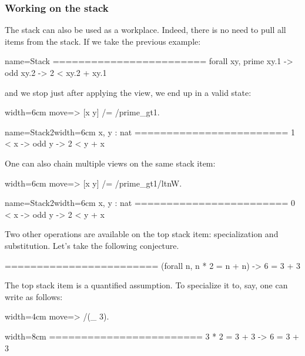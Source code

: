 \subsubsection{Working on the stack}

The stack can also be used as a workplace.  Indeed, there is no need
to pull all items from the stack.  If we take the previous example:

\begin{coqout}{name=Stack}{}
========================
forall xy, prime xy.1 -> odd xy.2 -> 2 < xy.2 + xy.1
\end{coqout}
and we stop just after applying the view, we end up in a valid state:

\begin{coq-left}{}{width=6cm}
move=> [x y] /= /prime_gt1.
$~$
$~$
\end{coq-left}
\begin{coqout-right}{name=Stack2}{width=6cm}
 x, y : nat
 ========================
 1 < x -> odd y -> 2 < y + x
\end{coqout-right}

One can also chain multiple views on the same stack item:

\begin{coq-left}{}{width=6cm}
move=> [x y] /= /prime_gt1/ltnW.
$~$
$~$
\end{coq-left}
\begin{coqout-right}{name=Stack2}{width=6cm}
 x, y : nat
 ========================
 0 < x -> odd y -> 2 < y + x
\end{coqout-right}

Two other operations are available on the top stack item: specialization
and substitution.  Let's take the following conjecture.

\begin{coqout}{}{}
========================
(forall n, n * 2 = n + n) -> 6 = 3 + 3
\end{coqout}

The top stack item is a quantified assumption.  To specialize it to, say,
 one can write as follows:

\begin{coq-left}{}{width=4cm}
move=> /(_ 3).
$~$
\end{coq-left}
\begin{coqout-right}{}{width=8cm}
========================
3 * 2 = 3 + 3 -> 6 = 3 + 3
\end{coqout-right}

